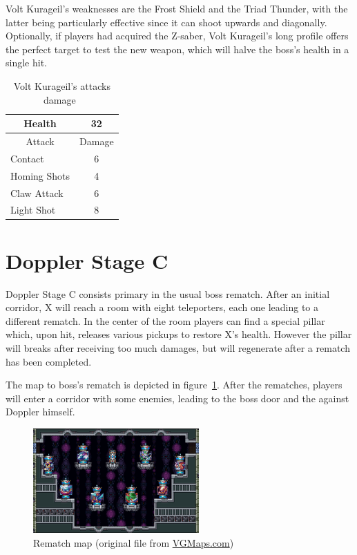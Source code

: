 Volt Kurageil's weaknesses are the Frost Shield and the Triad Thunder, with the latter being particularly effective since it can shoot upwards and diagonally. Optionally, if players had acquired the Z-saber, Volt Kurageil's long profile offers the perfect target to test the new weapon, which will halve the boss's health in a single hit.
\begin{table}[htp]
	\centering
	\begin{tabular}[h]{l c}
		\toprule
		\multicolumn{1}{c}{Health}  & 32 \\
		\midrule
		\multicolumn{1}{c}{Attack} & \multicolumn{1}{c}{Damage}\\
		Contact & 6 \\
		Homing Shots & 4\\
		Claw Attack & 6\\
		Light Shot& 8\\
		\bottomrule
	\end{tabular}
	\caption{Volt Kurageil's attacks damage~\cite{wiki:Volt_kurageil,book:Compendium}}
\end{table}

\section{Doppler Stage C}
Doppler Stage C consists primary in the usual boss rematch. After an initial corridor, X will reach a room with eight teleporters, each one leading to a different rematch. In the center of the room players can find a special pillar which, upon hit, releases various pickups to restore X's health. However the pillar will breaks after receiving too much damages, but will regenerate after a rematch has been completed.

The map to boss's rematch is depicted in figure~\ref{fig:x3-rematch}.
After the rematches, players will enter a corridor with some enemies, leading to the boss door and the  against Doppler himself.
\begin{figure}[htp]
	\centering
	\includegraphics[height=4cm]{figures/X3/Doppler_stages/rematch.png}
	\caption{Rematch map (original file from \href{https://vgmaps.com/Atlas/SuperNES/MegaManX3-DrDoppler'sLab-Stage3.png}{VGMaps.com})}
	\label{fig:x3-rematch}
\end{figure}

